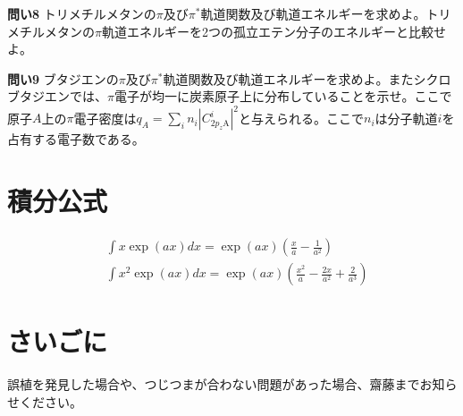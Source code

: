 \documentclass[11pt,pra,aps]{revtex4}
\begin{document}
\noindent
{\bf 問い8} トリメチルメタンの$\pi$及び$\pi^*$軌道関数及び軌道エネルギーを求めよ。トリメチルメタンの$\pi$軌道エネルギーを2つの孤立エテン分子のエネルギーと比較せよ。

\noindent
{\bf 問い9} ブタジエンの$\pi$及び$\pi^*$軌道関数及び軌道エネルギーを求めよ。またシクロブタジエンでは、$\pi$電子が均一に炭素原子上に分布していることを示せ。ここで原子$A$上の$\pi$電子密度は$q_A=\sum_i n_i |C^i_{2p_z\text{A}}|^2$と与えられる。ここで$n_i$は分子軌道$i$を占有する電子数である。

\section{積分公式}
\begin{align}
  &\int x   \exp(ax) dx = \exp(ax)\left(\frac{x  }{a}-\frac{1}{a^2}\right) \\
  &\int x^2 \exp(ax) dx = \exp(ax)\left(\frac{x^2}{a}-\frac{2x}{a^2}+\frac{2}{a^3}\right) 
\end{align}

\section{さいごに}

誤植を発見した場合や、つじつまが合わない問題があった場合、齋藤までお知らせください。
\end{document}
